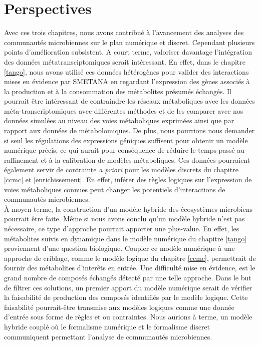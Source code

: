 \documentclass[../main.tex]{subfiles}
\begin{document}
\newpage
\section*{Perspectives}

Avec ces trois chapitres, nous avons contribué à l'avancement des analyses des communautés microbiennes sur le plan numérique et discret. Cependant plusieurs points d'amélioration subsistent. A court terme, valoriser davantage l'intégration des données métatransciptomiques serait intéressant. En effet, dans le chapitre \ref{tango}, nous avons utilisé ces données hétérogènes pour valider des interactions mises en évidence par SMETANA en regardant l'expression des gènes associés à la production et à la consommation des métabolites présumés échangés. Il pourrait être intéressant de contraindre les réseaux métaboliques avec les données méta-transcriptomiques avec différentes méthodes \citep{Jenior2020,Agren2012,Becker2008} et de les comparer avec nos données simulées au niveau des voies métaboliques exprimées ainsi que par rapport aux données de métabolomiques. De plus, nous pourrions nous demander si seul les régulations des expressions géniques suffisent pour obtenir un modèle numérique précis, ce qui aurait pour conséquence de réduire le temps passé au raffinement et à la  calibration de modèles métaboliques. Ces données pourraient également servir de contrainte \textit{a priori} pour les modèles discrets du chapitre \ref{ccmc} et \ref{enrichissement}. En effet, inférer des règles logiques sur l'expression de voies métaboliques connues peut changer les potentiels d'interactions de communautés microbiennes. \\

À moyen terme, la construction d'un modèle hybride des écosystèmes microbiens pourrait être faite. Même si nous avons conclu qu'un modèle hybride n'est pas nécessaire, ce type d'approche pourrait apporter une plus-value. En effet, les métabolites suivis en dynamique dans le modèle numérique du chapitre \ref{tango} proviennent d'une question biologique. Coupler ce modèle numérique à une approche de criblage, comme le modèle logique du chapitre \ref{ccmc}, permettrait de fournir des métabolites d'interêts en entrée. Une difficulté mise en évidence, est le grand nombre de composés échangés détecté par une telle approche. Dans le but de filtrer ces solutions, un premier apport du modèle numérique serait de vérifier la faisabilité de production des composés identifiés par le modèle logique. Cette faisabilité pourrait-être transmise aux modèles logiques comme une donnée d'entrée sous forme de règles et ou contraintes. Nous aurions à terme, un modèle hybride couplé où le formalisme numérique et le formalisme discret communiquent permettant l'analyse de communautés microbiennes.\\
\end{document}

